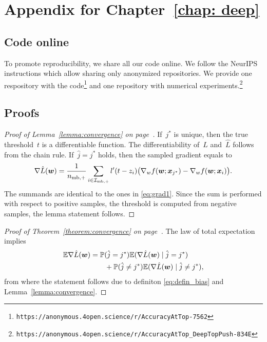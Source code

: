 \chapter{Appendix for Chapter~\ref{chap: deep}}

\section{Code online}

To promote reproducibility, we share all our code online. We follow the NeurIPS instructions which allow sharing only anonymized repositories. We provide one respository with the code\footnote{\texttt{https://anonymous.4open.science/r/AccuracyAtTop-7562}} and one repository with numerical experiments.\footnote{\texttt{https://anonymous.4open.science/r/AccuracyAtTop\_DeepTopPush-834E}}

\section{Proofs}

\lemmacovergencedeep*
\begin{proof}[Proof of Lemma~\ref{lemma:convergence} on page~\pageref{lemma:convergence}]
  If~$j^*$ is unique, then the true threshold~$t$ is a differentiable function. The differentiability of~$L$ and~$\hat L$ follows from the chain rule. If~$\hat j=j^*$ holds, then the sampled gradient equals to
  \begin{equation}\label{eq:grad_min_aux}
    \nabla \hat L(\bm{w})= \frac{1}{n_{\text{mb},+}}\sum_{i\in \mathcal{I}_{\text{mb},+}}l'(t-z_i)\big(\nabla_w f(\bm{w};\bm{x}_{j^*}) - \nabla_w f(\bm{w};\bm{x}_i) \big).
  \end{equation}
  The summands are identical to the ones in \eqref{eq:grad1}. Since the sum is performed with respect to positive samples, the threshold is computed from negative samples, the lemma statement follows.
\end{proof}

\thmcovergencedeep*
\begin{proof}[Proof of Theorem~\ref{theorem:convergence} on page~\pageref{theorem:convergence}]
  The law of total expectation implies
  \begin{equation*}
    \begin{aligned}
      \mathbb{E} \nabla \hat L(\bm{w})
      & = \mathbb{P}(\hat j=j^*)\mathbb{E}(\nabla \hat L(\bm{w}) \mid \hat j=j^*) \\
      & \qquad + \mathbb{P}(\hat j\neq j^*)\mathbb{E}(\nabla \hat L(\bm{w}) \mid \hat j\neq j^*),
    \end{aligned}
  \end{equation*}
  from where the statement follows due to definiton \eqref{eq:defin_bias} and Lemma~\ref{lemma:convergence}.
\end{proof}


